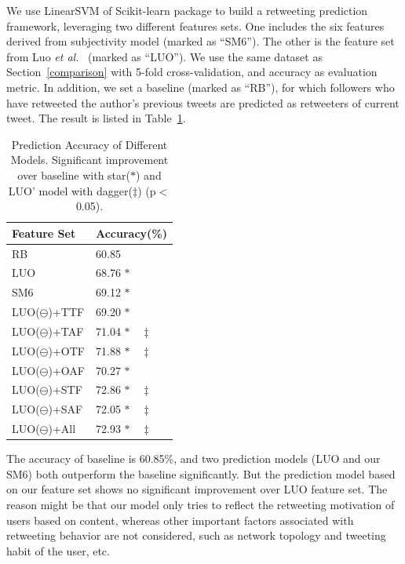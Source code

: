 \documentclass[twocolumn]{svjour3}          %
\begin{document}
We use LinearSVM of Scikit-learn package to build a retweeting prediction framework, leveraging two different features sets. One includes the six features derived from subjectivity model (marked as ``SM6''). The other is the feature set from Luo \emph{et al.}~\cite{Luo:2013RMF} (marked as ``LUO''). We use the same dataset as Section~\ref{comparison} with 5-fold cross-validation, and accuracy as evaluation metric. 
In addition, we set a baseline (marked as ``RB''), for which followers who have retweeted the author's previous tweets are predicted as retweeters of current tweet. 
The result is listed in Table~\ref{table2}. 
\begin{table}
\centering
\caption{Prediction Accuracy of Different Models. Significant improvement over baseline with star($ \ast $) and LUO' model with dagger($ \ddagger $) (p$ < $0.05).}
\label{table2}
\begin{tabular}{ll}
\hline
Feature Set & Accuracy(\%) \\
\hline
RB & 60.85  \\
LUO & 68.76 $ \ast  $\\
SM6 & 69.12  $ \ast $ \\
LUO($ \ominus $)+TTF & 69.20  $ \ast $ \\
LUO($ \ominus $)+TAF & 71.04  $ \ast \quad \ddagger $ \\
LUO($ \ominus $)+OTF & 71.88  $ \ast \quad \ddagger $ \\
LUO($ \ominus $)+OAF & 70.27  $ \ast $ \\
LUO($ \ominus $)+STF & 72.86  $ \ast \quad \ddagger $ \\
LUO($ \ominus $)+SAF & 72.05  $ \ast \quad \ddagger $ \\
LUO($ \ominus $)+All & 72.93  $ \ast \quad \ddagger $ \\
\hline
\end{tabular}
\end{table}
The accuracy of baseline is 60.85\%, and two prediction models (LUO and our SM6) both outperform the baseline significantly. 
But the prediction model based on our feature set shows no significant improvement over LUO feature set. 
The reason might be that our model only tries to reflect the retweeting motivation of users based on content, whereas other important factors associated with retweeting behavior are not considered, such as network topology and tweeting habit of the user, etc. 
\end{document}
